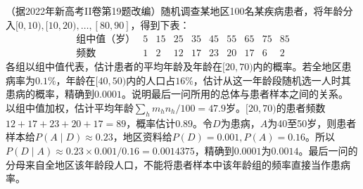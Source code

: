 （据2022年新高考II卷第19题改编）随机调查某地区100名某疾病患者，将年龄分入\([0,10),[10,20),\ldots,[80,90]\)，得到下表：
\[
\begin{array}{c|rrrrrrrrr}
 \text{组中值（岁）}&5&15&25&35&45&55&65&75&85\\\hline
 \text{频数}&1&2&12&17&23&20&17&6&2
\end{array}
\]
各组以组中值代表，估计患者的平均年龄及年龄在\([20,70)\)内的概率。若全地区患病率为\(0.1\%\)，年龄在\([40,50)\)内的人口占\(16\%\)，估计从这一年龄段随机选一人时其患病的概率，精确到\(0.0001\)。说明最后一问所用的总体与患者样本之间的关系。
\solutionanswer
以组中值加权，估计平均年龄\(\sum_hm_hn_h/100=47.9\)岁。\([20,70)\)的患者频数\(12+17+23+20+17=89\)，概率估计\(0.89\)。令\(D\)为患病，\(A\)为40至50岁，则患者样本给\(P(A\mid D)\approx0.23\)，地区资料给\(P(D)=0.001,P(A)=0.16\)。所以\(P(D\mid A)\approx0.23\times0.001/0.16=0.0014375\)，精确到\(0.0001\)为\(0.0014\)。最后一问的分母来自全地区该年龄段人口，不能将患者样本中该年龄组的频率直接当作患病率。
\par
